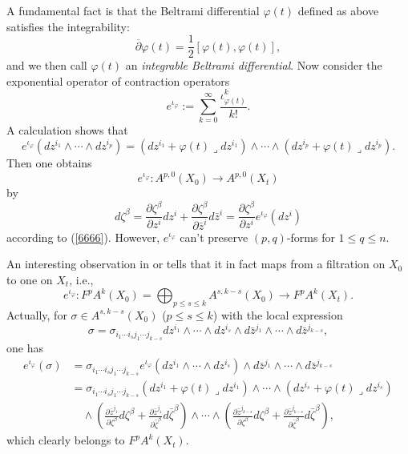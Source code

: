 \documentclass[12pt]{amsart}
\numberwithin{equation}{section}
\theoremstyle{definition}
\theoremstyle{definition}
\theoremstyle{definition}
\renewcommand{\1}{\mathsf{1}}
\renewcommand{\>}{\rightarrow}
\newcommand{\bp}{\overline\partial}
\def\v{\varphi}
\def\l{\lrcorner}
\theoremstyle{plain} %
\theoremstyle{plain} %
\theoremstyle{plain} %
\begin{document}
	A fundamental fact is that the Beltrami differential $\varphi(t)$
	defined as above satisfies the integrability:
	\begin{equation*}\label{int-conditin}
		\bp\varphi(t)=\frac{1}{2}[\varphi(t),\varphi(t)],
	\end{equation*}
	and we then call $\varphi(t)$ an \textit{integrable Beltrami differential}.
	Now  consider the exponential operator of contraction operators
	$$e^{\iota_\v}:=\sum_{k=0}^{\infty}\frac{{\iota^k_{\v(t)}}}{k!}.$$
	A calculation shows  that $$e^{\iota_{\varphi}}\left(d z^{i_{1}} \wedge \cdots \wedge d z^{i_{p}}\right)=\left(d z^{i_{1}}+{\varphi(t)}\l d z^{i_{1}}\right) \wedge \cdots \wedge\left(d z^{i_{p}}+{\varphi(t)}\l d z^{i_{p}}\right).$$
	Then one obtains $$
	e^{\iota_{\v}}: A^{p, 0}(X_0) \longrightarrow A^{p, 0}(X_{t})
	$$
	by
	$$d \zeta^{\beta}=\frac{\partial \zeta^{\beta}}{\partial z^{i}} d z^{i}+\frac{\partial \zeta^{\beta}}{\partial \bar{z}^{i}} d \bar{z}^{i}=\frac{\partial \zeta^{\beta}}{\partial z^{i}}e^{\iota_\varphi} (d z^{i})$$
	according to (\ref{6666}). However, $e^{\iota_{\v}}$ can't preserve $(p,q)$-forms for $1\leq q\leq n.$  
    
    An interesting observation in \cite[Theorem 5.1]{FM09} or \cite[Section 3.1]{WZ20} tells that it in fact maps from a filtration on $X_0$ to one on $X_t$, i.e.,
	$$
	e^{\iota_{\varphi}}: F^{p} A^{k}(X_0)=\mathop\bigoplus_{p \leq s
		\leq k} A^{ s, k- s}(X_0) \longrightarrow F^{p} A^{k}(X_{t}).
	$$
	Actually, for $\sigma \in A^{ s, k- s}(X_0)$  ($p \leq  s \leq k$) with  the local expression
	$$\sigma=\sigma_{i_1\cdots i_s {j}_1\cdots {j}_{k-s}}dz^{i_1}\wedge \cdots \wedge d z^{i_{ s}} \wedge d \bar{z}^{j_{1}} \wedge \cdots \wedge d \bar{z}^{j_{k- s}},$$ one has
	$$\label{opearte}
	\begin{aligned}
		e^{\iota_{\varphi}}(\sigma)
		&=\sigma_{i_1\cdots i_s {j}_1\cdots {j}_{k-s}}e^{\iota_\varphi}\left(d z^{i_{1}} \wedge \cdots \wedge d z^{i_{ s}}\right) \wedge d \bar{z}^{j_{1}} \wedge \cdots \wedge d \bar{z}^{j_{k- s}} \\
		&=\sigma_{i_1\cdots i_s {j}_1\cdots {j}_{k-s}}\left(d z^{i_{1}}+{\varphi(t)}\l  d z^{i_{1}}\right) \wedge \cdots \wedge\left(d z^{i_{ s}}+{\varphi(t)}\l  d z^{i_{ s}}\right)\\&\quad\wedge\left(\frac{\partial \bar{z}^{j_{1}}}{\partial \zeta^ {\beta}} d \zeta^ {\beta}+\frac{\partial \bar{z}^{j_{1}}}{\partial \bar{\zeta}^ {\beta}} d \bar{\zeta}^ {\beta}\right) \wedge \cdots \wedge\left(\frac{\partial \bar{z}^{j_{k- s}}}{\partial \zeta^ {\beta}} d \zeta^ {\beta}+\frac{\partial \bar{z}^{j_{k- s}}}{\partial \bar{\zeta}^ {\beta}} d \bar{\zeta}^ {\beta}\right),
	\end{aligned}
	$$
	which clearly belongs to $F^{p} A^{k}\left(X_{t}\right)$. 
    
\end{document}
